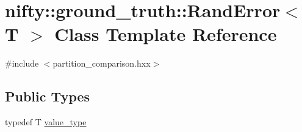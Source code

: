 \hypertarget{classnifty_1_1ground__truth_1_1RandError}{}\section{nifty\+:\+:ground\+\_\+truth\+:\+:Rand\+Error$<$ T $>$ Class Template Reference}
\label{classnifty_1_1ground__truth_1_1RandError}


{\ttfamily \#include $<$partition\+\_\+comparison.\+hxx$>$}

\subsection*{Public Types}
\begin{DoxyCompactItemize}
\item 
typedef T \hyperlink{classnifty_1_1ground__truth_1_1RandError_a8ccf604387e3b5ed939c97c22c75acf9}{value\+\_\+type}
\end{DoxyCompactItemize}

